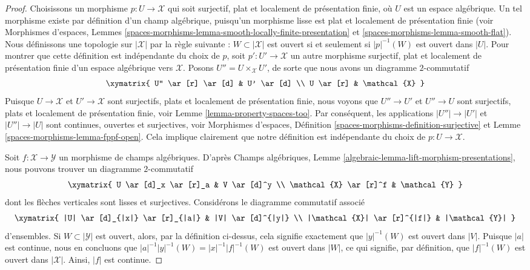 \begin{proof}
Choisissons un morphisme $p : U \to \mathcal{X}$ qui soit
surjectif, plat et localement de présentation finie,
où $U$ est un espace algébrique. Un tel morphisme existe par définition d'un champ
algébrique, puisqu'un morphisme lisse est plat et localement de présentation finie
(voir
Morphismes d'espaces,
Lemmes \ref{spaces-morphisms-lemma-smooth-locally-finite-presentation} et
\ref{spaces-morphisms-lemma-smooth-flat}).
Nous définissons une topologie sur $|\mathcal{X}|$ par la règle suivante :
$W \subset |\mathcal{X}|$ est ouvert si et seulement si $|p|^{-1}(W)$ est ouvert
dans $|U|$. Pour montrer que cette définition est indépendante du choix de $p$, soit
$p' : U' \to \mathcal{X}$ un autre morphisme surjectif, plat et
localement de présentation finie d'un espace algébrique vers
$\mathcal{X}$. Posons $U'' = U \times_\mathcal{X} U'$,
de sorte que nous avons un diagramme $2$-commutatif
$$
\xymatrix{
U'' \ar[r] \ar[d] & U' \ar[d] \\
U \ar[r] & \mathcal{X}
}
$$
Puisque $U \to \mathcal{X}$ et $U' \to \mathcal{X}$ sont surjectifs, plats et
localement de présentation finie, nous voyons que $U'' \to U'$ et $U'' \to U$
sont surjectifs, plats et localement de présentation finie, voir
Lemme \ref{lemma-property-spaces-too}.
Par conséquent, les applications $|U''| \to |U'|$ et $|U''| \to |U|$ sont continues, ouvertes
et surjectives, voir
Morphismes d'espaces,
Définition \ref{spaces-morphisms-definition-surjective} et
Lemme \ref{spaces-morphisms-lemma-fppf-open}.
Cela implique clairement que notre définition est indépendante du choix
de $p : U \to \mathcal{X}$.

\medskip\noindent
Soit $f : \mathcal{X} \to \mathcal{Y}$ un morphisme de champs algébriques.
D'après
Champs algébriques, Lemme \ref{algebraic-lemma-lift-morphism-presentations},
nous pouvons trouver un diagramme $2$-commutatif
$$
\xymatrix{
U \ar[d]_x \ar[r]_a & V \ar[d]^y \\
\mathcal{X} \ar[r]^f & \mathcal{Y}
}
$$
dont les flèches verticales sont lisses et surjectives.
Considérons le diagramme commutatif associé
$$
\xymatrix{
|U| \ar[d]_{|x|} \ar[r]_{|a|} & |V| \ar[d]^{|y|} \\
|\mathcal{X}| \ar[r]^{|f|} & |\mathcal{Y}|
}
$$
d'ensembles. Si $W \subset |\mathcal{Y}|$ est ouvert, alors, par la définition
ci-dessus, cela signifie exactement que $|y|^{-1}(W)$ est ouvert dans $|V|$. Puisque
$|a|$ est continue, nous en concluons que
$|a|^{-1}|y|^{-1}(W) = |x|^{-1}|f|^{-1}(W)$ est ouvert dans $|W|$, ce qui signifie,
par définition, que $|f|^{-1}(W)$ est ouvert dans $|\mathcal{X}|$.
Ainsi, $|f|$ est continue.


\end{proof}
